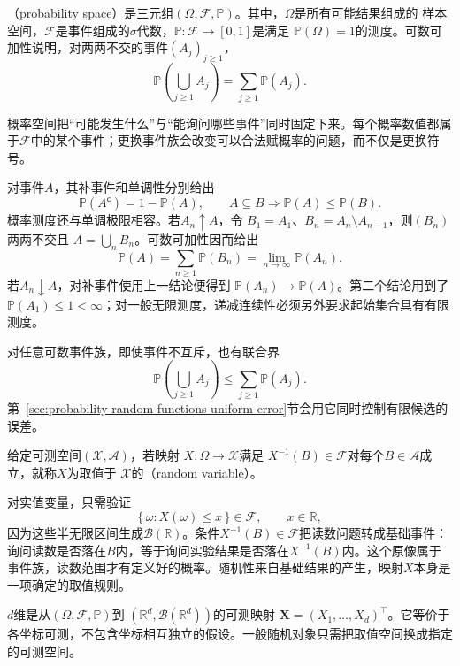 \begin{definition}[概率空间]
  \label{def:probability-space}
（probability space）是三元组\((\Omega,\mathcal{F},\mathbb{P})\)。其中，\(\Omega\)是所有可能结果组成的
样本空间，\(\mathcal{F}\)是事件组成的\(\sigma\)代数，\(\mathbb{P}:\mathcal{F}\to[0,1]\)是满足
\(\mathbb{P}(\Omega)=1\)的测度。可数可加性说明，对两两不交的事件\((A_j)_{j\geq1}\)，
\[ \mathbb{P}\left(\bigcup_{j\geq1}A_j\right)
  =\sum_{j\geq1}\mathbb{P}(A_j). \]
\end{definition}
概率空间把“可能发生什么”与“能询问哪些事件”同时固定下来。每个概率数值都属于\(\mathcal F\)中的某个事件；更换事件族会改变可以合法赋概率的问题，而不仅是更换符号。

对事件\(A\)，其补事件和单调性分别给出
\[ \mathbb{P}(A^{\mathsf c})=1-\mathbb{P}(A),
  \qquad A\subseteq B\Longrightarrow\mathbb{P}(A)\leq\mathbb{P}(B). \]
概率测度还与单调极限相容。若\(A_n\uparrow A\)，令
\(B_1=A_1\)、\(B_n=A_n\setminus A_{n-1}\)，则\((B_n)\)两两不交且
\(A=\bigcup_nB_n\)。可数可加性因而给出
\[
  \mathbb{P}(A)
  =\sum_{n\geq1}\mathbb{P}(B_n)
  =\lim_{n\to\infty}\mathbb{P}(A_n).
\]
若\(A_n\downarrow A\)，对补事件使用上一结论便得到
\(\mathbb{P}(A_n)\to\mathbb{P}(A)\)。第二个结论用到了
\(\mathbb{P}(A_1)\leq1<\infty\)；对一般无限测度，递减连续性必须另外要求起始集合具有有限测度。

对任意可数事件族，即使事件不互斥，也有联合界
\begin{equation}
  \mathbb{P}\left(\bigcup_{j\geq1}A_j\right)
  \leq
  \sum_{j\geq1}\mathbb{P}(A_j).
  \label{eq:probability-union-bound}
\end{equation}
第~\ref{sec:probability-random-functions-uniform-error}节会用它同时控制有限候选的误差。
\begin{definition}[随机变量]
  \label{def:probability-random-variable}
给定可测空间\((\mathcal{X},\mathcal{A})\)，若映射
\(X:\Omega\to\mathcal{X}\)满足
\(X^{-1}(B)\in\mathcal{F}\)对每个\(B\in\mathcal{A}\)成立，就称\(X\)为取值于
\(\mathcal{X}\)的（random variable）。
\end{definition}
对实值变量，只需验证
\[ \{\,\omega:X(\omega)\leq x\,\}\in\mathcal{F},
  \qquad x\in\mathbb{R}, \]
因为这些半无限区间生成\(\mathcal{B}(\mathbb{R})\)。条件\(X^{-1}(B)\in\mathcal F\)把读数问题转成基础事件：询问读数是否落在\(B\)内，等于询问实验结果是否落在\(X^{-1}(B)\)内。这个原像属于事件族，读数范围才有定义好的概率。随机性来自基础结果的产生，映射\(X\)本身是一项确定的取值规则。

\begin{definition}[随机向量]
\label{def:rv-random-vector}
\(d\)维是从\((\Omega,\mathcal F,\mathbb P)\)到
\((\mathbb R^d,\mathcal B(\mathbb R^d))\)的可测映射
\(\bm X=(X_1,\ldots,X_d)^\top\)。它等价于各坐标可测，不包含坐标相互独立的假设。一般随机对象只需把取值空间换成指定的可测空间。
\end{definition}

